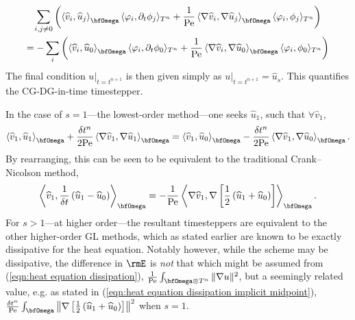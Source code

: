 \begin{example}
\begin{align}
        \end{align}
        \vspace{-8mm}
        \begin{multline}
            \sum_{i, j \neq 0}\left(\left\langle\widehat{v}_{i}, \widehat{u}_{j}\right\rangle_{\bfOmega}\langle\varphi_{i}, \partial_{t}\phi_{j}\rangle_{T^{n}} + \frac{1}{\rmPe}\left\langle\nabla\widehat{v}_{i}, \nabla\widehat{u}_{j}\right\rangle_{\bfOmega}\langle\varphi_{i}, \phi_{j}\rangle_{T^{n}}\right)  \\
            =  - \sum_{i}\left(\left\langle\widehat{v}_{i}, \widehat{u}_{0}\right\rangle_{\bfOmega}\langle\varphi_{i}, \partial_{t}\phi_{0}\rangle_{T^{n}} + \frac{1}{\rmPe}\left\langle\nabla\widehat{v}_{i}, \nabla\widehat{u}_{0}\right\rangle_{\bfOmega}\langle\varphi_{i}, \phi_{0}\rangle_{T^{n}}\right)
        \end{multline}
        The final condition $u|_{t = t^{n + 1}}$ is then given simply as $u|_{t = t^{n + 1}}  =  \widehat{u}_{s}$. This quantifies the CG-DG-in-time timestepper.

        In the case of $s  =  1$---the lowest-order method---one seeks $\widehat{u}_{1}$, such that $\forall \widehat{v}_{1}$,
        \begin{equation}
            \left\langle\widehat{v}_{1}, \widehat{u}_{1}\right\rangle_{\bfOmega} + \frac{\delta t^{n}}{2\rmPe}\left\langle\nabla\widehat{v}_{1}, \nabla\widehat{u}_{1}\right\rangle_{\bfOmega}  =  \left\langle\widehat{v}_{1}, \widehat{u}_{0}\right\rangle_{\bfOmega} - \frac{\delta t^{n}}{2\rmPe}\left\langle\nabla\widehat{v}_{1}, \nabla\widehat{u}_{0}\right\rangle_{\bfOmega}.
        \end{equation}
        By rearranging, this can be seen to be equivalent to the traditional Crank--Nicolson method,
        \begin{equation}
            \left\langle\widehat{v}_{1}, \frac{1}{\delta t}\left(\widehat{u}_{1} - \widehat{u}_{0}\right)\right\rangle_{\bfOmega}  =  - \frac{1}{\rmPe}\left\langle\nabla\widehat{v}_{1}, \nabla\left[\frac{1}{2}\left(\widehat{u}_{1} + \widehat{u}_{0}\right)\right]\right\rangle_{\bfOmega}.
        \end{equation}
        For $s  >  1$---at higher order---the resultant timesteppers are equivalent to the other higher-order GL methods, which as stated earlier are known to be exactly dissipative for the heat equation. Notably however, while the scheme may be dissipative, the difference in $\rmE$ is \emph{not} that which might be assumed from (\ref{eqn:heat equation dissipation}), $\frac{1}{\rmPe}\int_{\bfOmega\otimes T^{n}}\|\nabla u\|^{2}$, but a seemingly related value, e.g. as stated in (\ref{eqn:heat equation dissipation implicit midpoint}), $\frac{\delta t^{n}}{\rmPe}\int_{\bfOmega}\left\|\nabla\left[\frac{1}{2}\left(\widehat{u}_{1} + \widehat{u}_{0}\right)\right]\right\|^{2}$ when $s = 1$.
    \end{example}